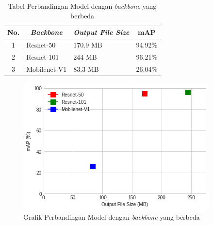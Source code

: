 \begin{table}[h]
	\centering
	\begin{tabular}{|c|l|l|l|}
		\hline
		\textbf{No.} & \multicolumn{1}{c|}{\textit{\textbf{Backbone}}} & \multicolumn{1}{c|}{\textit{\textbf{Output File Size}}} & \multicolumn{1}{c|}{\textbf{mAP}} \\ \hline
		1            & Resnet-50                                       & 170.9 MB                                                & 94.92\%                           \\ \hline
		2            & Resnet-101                                      & 244 MB                                                  & 96.21\%                           \\ \hline
		3            & Mobilenet-V1                                    & 83.3 MB                                                 & 26.04\%                           \\ \hline
	\end{tabular}
	\caption{Tabel Perbandingan Model dengan \textit{backbone} yang berbeda}
	\label{tab:train-recap}
\end{table}

\newpage

\begin{figure}[h]
	\centering
	\includegraphics[scale=0.75]{gambar/graph-recap.png}
	\caption{Grafik Perbandingan Model dengan \textit{backbone} yang berbeda}
	\label{fig:graph-recap}
\end{figure}